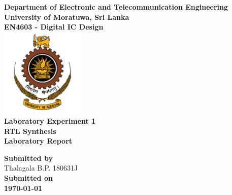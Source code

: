 \begin{titlepage}
\center %

\textbf{\large Department of Electronic and Telecommunication Engineering}\\[0.5cm]
\textbf{\Large University of Moratuwa, Sri Lanka}\\[1cm]
\textbf{\large EN4603 - Digital IC Design}\\[2cm]
\includegraphics[width=0.3\textwidth]{figures/uomlogo}\\[2cm]

	
\textbf{\Huge Laboratory Experiment 1 \\RTL Synthesis }\\[0.2cm]
\textbf{\Large Laboratory Report}\\[5cm]




\vfill

\textbf{\large Submitted by}\\[0.5cm]

{\large Thalagala B.P.}	\hspace{5mm} {\large 180631J }\\[1cm]


\textbf{\large Submitted on}\\[0.5cm]
\textbf{\Large \today} %


\vfill %

\end{titlepage}